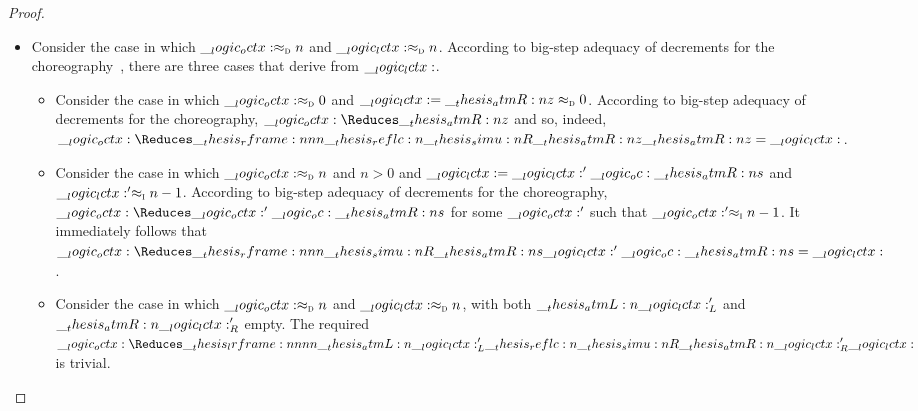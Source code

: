 \begin{proof}
\begin{itemize}
\begin{description}
\begin{itemize}
    \item
      Consider the case in which $\__logic_octx: \approx\sb{\text{\normalfont\scshape d}} n$ and $\__logic_lctx: \approx\sb{\text{\normalfont\scshape d}} n$.
    According to big-step adequacy of decrements for the choreography~, there are three cases that derive from $\__logic_lctx:$.
    \begin{itemize}
    \item 
      Consider the case in which $\__logic_octx: \approx\sb{\text{\normalfont\scshape d}} 0$ and $\__logic_lctx: = \__thesis_atmR:n {z} \approx\sb{\text{\normalfont\scshape d}} 0$.
      According to big-step adequacy of decrements for the choreography, $\octx \Reduces \atmR{z}$ and so, indeed, $\octx \Reduces\rframe{\reflc{\simu{R}}}{\atmR{z}} \atmR{z} = \lctx$.

    \item 
      Consider the case in which $\__logic_octx: \approx\sb{\text{\normalfont\scshape d}} n$ and $n > 0$ and $\__logic_lctx: = \__logic_lctx:' \__logic_oc: \__thesis_atmR:n {s}$ and $\__logic_lctx:' \approx\sb{\text{\normalfont\scshape i}} n-1$.
      According to big-step adequacy of decrements for the choreography, $\octx \Reduces \octx' \oc \atmR{s}$ for some $\__logic_octx:'$ such that $\__logic_octx:' \approx\sb{\text{\normalfont\scshape i}} n-1$.
      It immediately follows that $\octx \Reduces\rframe{\simu{R}}{\atmR{s}} \lctx' \oc \atmR{s} = \lctx$.

    \item
      Consider the case in which $\__logic_octx: \approx\sb{\text{\normalfont\scshape d}} n$ and $\__logic_lctx: \approx\sb{\text{\normalfont\scshape d}} n$, with both $\__thesis_atmL:n {\__logic_lctx:}'_L$ and $\__thesis_atmR:n {\__logic_lctx:}'_R$ empty.
      The required $\octx \Reduces\lrframe{\atmL{\lctx}'_L}{\reflc{\simu{R}}}{\atmR{\lctx}'_R} \lctx$ is trivial.
    \end{itemize}
    \end{itemize}




\end{description}
\end{itemize}
\end{proof}

